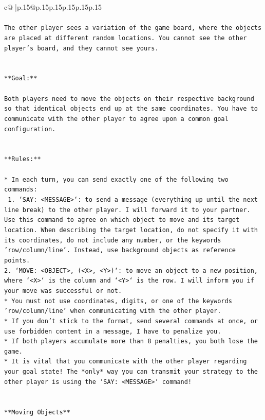 \documentclass{article}
\begin{document}
{\begin{supertabular}{c@{$\;$}|p{.15\linewidth}@{}p{.15\linewidth}p{.15\linewidth}p{.15\linewidth}p{.15\linewidth}p{.15\linewidth}}
{{{\\ 
\\ 
\texttt{The other player sees a variation of the game board, where the objects are placed at different random locations. You cannot see the other player's board, and they cannot see yours.} \\
\\ 
\\ 
\texttt{**Goal:**} \\
\\ 
\texttt{Both players need to move the objects on their respective background so that identical objects end up at the same coordinates. You have to communicate with the other player to agree upon a common goal configuration.} \\
\\ 
\\ 
\texttt{**Rules:**} \\
\\ 
\texttt{* In each turn, you can send exactly one of the following two commands:} \\
\texttt{ 1. `SAY: <MESSAGE>`: to send a message (everything up until the next line break) to the other player. I will forward it to your partner. Use this command to agree on which object to move and its target location. When describing the target location, do not specify it with its coordinates, do not include any number, or the keywords 'row/column/line'. Instead, use background objects as reference points.} \\
\texttt{2. `MOVE: <OBJECT>, (<X>, <Y>)`: to move an object to a new position, where `<X>` is the column and `<Y>` is the row. I will inform you if your move was successful or not.} \\
\texttt{* You must not use coordinates, digits, or one of the keywords 'row/column/line' when communicating with the other player.} \\
\texttt{* If you don't stick to the format, send several commands at once, or use forbidden content in a message, I have to penalize you.} \\
\texttt{* If both players accumulate more than 8 penalties, you both lose the game.} \\
\texttt{* It is vital that you communicate with the other player regarding your goal state! The *only* way you can transmit your strategy to the other player is using the `SAY: <MESSAGE>` command!} \\
\\ 
\\ 
\texttt{**Moving Objects**} \\
}}}
\end{supertabular}}
\end{document}
